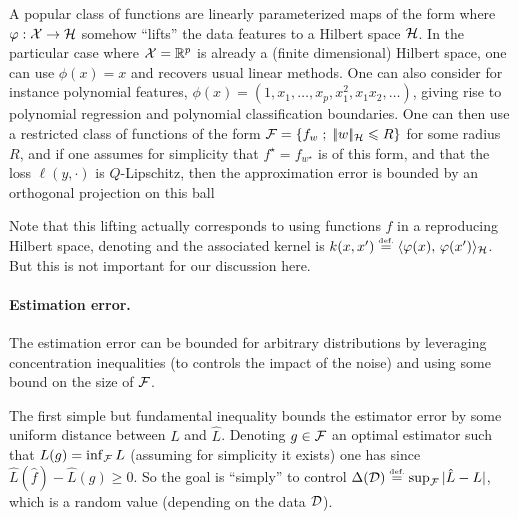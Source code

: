\begin{exmp}
A popular class of functions are linearly parameterized maps of the form 
where $\varphi : \mathcal{X} \rightarrow \mathcal{H}$ somehow ``lifts'' the data features to a Hilbert space $\mathcal{H}$. In the particular case where $\mathcal{X}=\mathbb{R}^p$ is already a (finite dimensional) Hilbert space, one can use $\phi(x)=x$ and recovers  usual linear methods. One can also consider for instance polynomial features, $\phi(x)=(1, x_1,\ldots,x_p,x_1^2,x_1 x_2, \ldots)$, giving rise to polynomial regression and polynomial classification boundaries.
%
One can then use a restricted class of functions of the form $\mathcal{F} = \left\{ f_w \;;\; |\!| w |\!|_{\mathcal{H}} \leqslant R \right\}$ for some radius $R$, and if one assumes for simplicity that $f^\star=f_{w^\star}$ is of this form, and that the loss $\ell(y,\cdot)$ is $Q$-Lipschitz, then the approximation error is bounded by an orthogonal projection on this ball
\end{exmp}

\begin{rem}
Note that this lifting actually corresponds to using functions $f$ in a reproducing Hilbert space, denoting
and the associated kernel is $k(x,x') \stackrel{\mbox{\upshape\tiny def.}}{=} \langle \varphi(x),\,\varphi(x')\rangle_{\mathcal{H}}$. But this is not important for our discussion here.
\end{rem}


\paragraph{Estimation error.}

The estimation error can be bounded for arbitrary distributions by leveraging concentration inequalities (to controls the impact of the noise) and using some bound on the size of $\mathcal{F}$. 

The first simple but fundamental inequality bounds the estimator error by some uniform distance between $L$ and $\hat L$. Denoting $g \in \mathcal{F}$ an optimal estimator  such that $L(g)=\inf_{\mathcal{F}} L$ (assuming for simplicity it exists) one has
since $\hat L(\hat f) - \hat L(g) \geq 0$.
%
So the goal is ``simply'' to control $\Delta(\mathcal{D}) \stackrel{\mbox{\upshape\tiny def.}}{=} \sup_{\mathcal{F}}|\hat L - L|$, which is a random value (depending on the data $\mathcal{D}$). 



